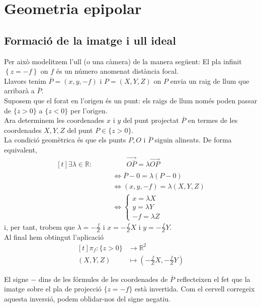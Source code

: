 \documentclass[a4paper,12pt]{article}
\begin{document}
	\section{Geometria epipolar}
	\subsection{Formació de la imatge i ull ideal}
	Per això modelitzem l'ull (o una càmera) de la manera següent:
	El pla infinit $\left\{z = -f\right\}$ on $f$ és un número anomenat distància focal.\\
	Llavors tenim $\overline{P} = \left(x,y,-f\right)$ i $P = \left(X, Y, Z\right)$ on $P$ envia un raig de llum que arribarà a $\overline{P}$.\\
	Suposem que el forat en l'origen és un punt: els raigs de llum només poden passar de $\{z > 0\}$ a $\{z < 0\}$ per l'origen.\\
	Ara determinem les coordenades $x$ i $y$ del punt projectat $\overline{P}$ en termes de les coordenades $X, Y, Z$ del punt $P \in \{z > 0\}$.\\
	La condició geomètrica és que els punts $P, O$ i $\overline{P}$ siguin alineats. De forma equivalent,
	\begin{displaymath}
		\begin{aligned}[t]
			\exists \lambda \in \mathbb{R} : \qquad&\qquad \overrightarrow{O\overline{P}} = \lambda \overrightarrow{OP}\\
			&\iff \overline{P}-0 = \lambda(P - 0)\\
			&\iff (x, y, -f) = \lambda(X, Y, Z)\\
			&\iff \begin{cases}
				x = \lambda X\\
				y = \lambda Y\\
				-f = \lambda Z
			\end{cases}
		\end{aligned}
	\end{displaymath}
	i, per tant, trobem que $\lambda = -\frac{f}{Z}$ i $x = -\frac{f}{Z}X$ i $y = -\frac{f}{Z}Y$.\\
	Al final hem obtingut l'aplicació
	\begin{displaymath}
		\begin{aligned}[t]
			\pi_f: \{z>0\} &\to \mathbb{R}^2\\
			(X, Y, Z) &\mapsto \left(-\frac{f}{Z}X, -\frac{f}{Z}Y\right)
		\end{aligned}
	\end{displaymath}
	\begin{obs}
		El signe $-$ dins de les fórmules de les coordenades de $\overline{P}$ reflecteixen el fet que la imatge sobre el pla de projecció $\{z = -f\}$ està invertida.
		Com el cervell corregeix aquesta inversió, podem oblidar-nos del signe negatiu.
	\end{obs}
\end{document}
